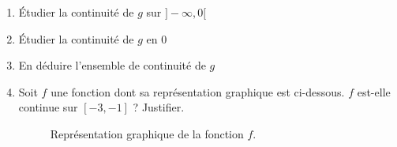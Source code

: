 \documentclass[12pt,a4paper]{article}
\begin{document}
\begin{enumerate}
    Sur \( [0, +\infty[ \), \( g(x) =   x + \sqrt{|x^2 - x|} \) qui est la somme de deux fonctions continues donc continue
    \item Étudier la continuité de \( g \) sur \( ]-\infty, 0[ \)
    \item Étudier la continuité de \( g \) en \( 0 \)
    \item En déduire l'ensemble de continuité de \( g \)
    \item Soit \( f \) une fonction dont sa représentation graphique est ci-dessous. \( f \) est-elle continue sur \( [-3, -1] \) ? Justifier.
          \begin{center}
              \begin{figure}[H]
                  \caption{Représentation graphique de la fonction \( f \).}
                  \label{fig:fonction_f}
              \end{figure}
          \end{center}
\end{enumerate}
\end{document}
